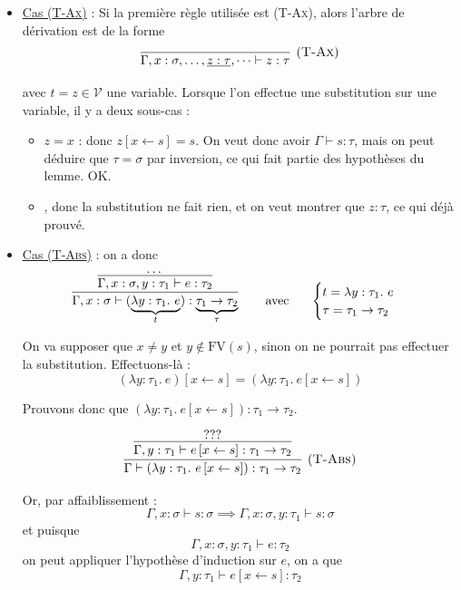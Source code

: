 \documentclass[11pt]{article}
\begin{document}
\begin{itemize}
    \item \underline{Cas ({\scshape{T-Ax}})} : Si la première règle utilisée est ({\scshape{T-Ax}}), alors l'arbre de dérivation est de la forme
    $$\infer[(\text{{\scshape{T-Ax}}})]{\Gamma, x:\sigma, \dots, \underline{z:\tau}, \dots \vdash z:\tau}{}$$

    avec $t=z\in\mathcal{V}$ une variable. Lorsque l'on effectue une substitution sur une variable, il y a deux sous-cas :
    \begin{itemize}
        \item \underline{$z=x$} : donc $z[x\leftarrow s] = s$. On veut donc avoir $\Gamma\vdash s:\tau$, mais on peut déduire que $\tau=\sigma$ par inversion, ce qui fait partie des hypothèses du lemme. OK.
        \item {}, donc la substitution ne fait rien, et on veut montrer que $z: \tau$, ce qui déjà prouvé.
    \end{itemize}

    \item \underline{Cas ({\scshape{T-Abs}})} : on a donc 
    $$\infer[]{\Gamma, x:\sigma\vdash (\underbrace{\lambda y:\tau_1.~e}_t):\underbrace{\tau_1\to\tau_2}_\tau}{\infer{\Gamma, x:\sigma, y:\tau_1\vdash e:\tau_2}{\dots}}~~~~~\text{avec}~~~~~\begin{cases}
        t = \lambda y:\tau_1.~e\\
        \tau=\tau_1\to\tau_2\\
    \end{cases}$$

    On va supposer que $x\ne y$ et $y\notin \text{FV}(s)$, sinon on ne pourrait pas effectuer la substitution. Effectuons-là :
    $$(\lambda y:\tau_1.~e)\left[x\leftarrow s\right] = (\lambda y:\tau_1.~e\left[x\leftarrow s\right])$$

    Prouvons donc que $(\lambda y:\tau_1.~e\left[x\leftarrow s\right]):\tau_1\to\tau_2$.

    $$
    \infer[\text{(\scshape{T-Abs})}]{
        \Gamma\vdash (\lambda y:\tau_1.~e\left[x\leftarrow s\right]):\tau_1\to\tau_2
    }
    {
        \infer{\Gamma, y:\tau_1\vdash e\left[x\leftarrow s\right]:\tau_1\to\tau_2}{???}
    }
    $$

    Or, par affaiblissement :
    $$
        \Gamma, x:\sigma \vdash s:\sigma\implies \Gamma, x:\sigma, y:\tau_1 \vdash s:\sigma
    $$
    et puisque $$\Gamma, x:\sigma, y:\tau_1\vdash e:\tau_2$$
    on peut appliquer l'hypothèse d'induction sur $e$, on a que $$\Gamma, y:\tau_1\vdash e[x\leftarrow s]:\tau_2$$


\end{itemize}
\end{document}

